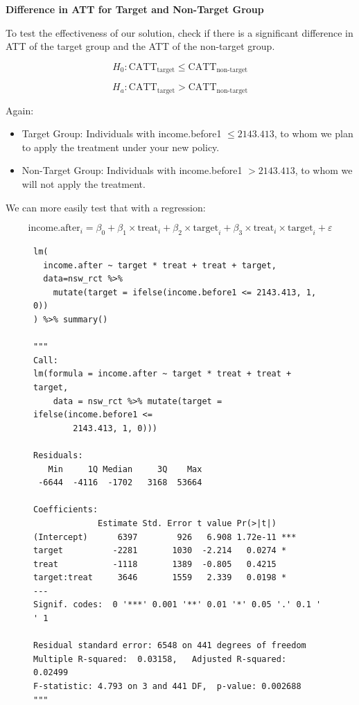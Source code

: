 \documentclass{article}
\begin{document}
\textbf{Difference in ATT for Target and Non-Target Group}

To test the effectiveness of our solution, check if there is a significant difference in ATT of the target group and the ATT of the non-target group.

$$
H_0 : \text{CATT}_{\text{target}} \leq \text{CATT}_{\text{non-target}} 
$$

$$
H_a : \text{CATT}_{\text{target}} > \text{CATT}_{\text{non-target}} 
$$

Again:

\begin{itemize}
    \item Target Group: Individuals with income.before1 $\leq 2143.413$, to whom we plan to apply the treatment under your new policy.
    \item Non-Target Group: Individuals with income.before1 $> 2143.413$, to whom we will not apply the treatment.
\end{itemize}

We can more easily test that with a regression:

$$
\text{income.after}_i = \beta_0 + \beta_1 \times \text{treat}_i + \beta_2 \times \text{target}_i + \beta_3 \times \text{treat}_i \times \text{target}_i + \varepsilon
$$

\begin{figure}[H]
\centering
\begin{lstlisting}[style=Rstyle, caption=ATT]
lm(
  income.after ~ target * treat + treat + target,
  data=nsw_rct %>% 
    mutate(target = ifelse(income.before1 <= 2143.413, 1, 0))
) %>% summary()

"""
Call:
lm(formula = income.after ~ target * treat + treat + target, 
    data = nsw_rct %>% mutate(target = ifelse(income.before1 <= 
        2143.413, 1, 0)))

Residuals:
   Min     1Q Median     3Q    Max 
 -6644  -4116  -1702   3168  53664 

Coefficients:
             Estimate Std. Error t value Pr(>|t|)    
(Intercept)      6397        926   6.908 1.72e-11 ***
target          -2281       1030  -2.214   0.0274 *  
treat           -1118       1389  -0.805   0.4215    
target:treat     3646       1559   2.339   0.0198 *  
---
Signif. codes:  0 '***' 0.001 '**' 0.01 '*' 0.05 '.' 0.1 ' ' 1

Residual standard error: 6548 on 441 degrees of freedom
Multiple R-squared:  0.03158,	Adjusted R-squared:  0.02499 
F-statistic: 4.793 on 3 and 441 DF,  p-value: 0.002688
"""
\end{lstlisting}
\end{figure}
\end{document}
